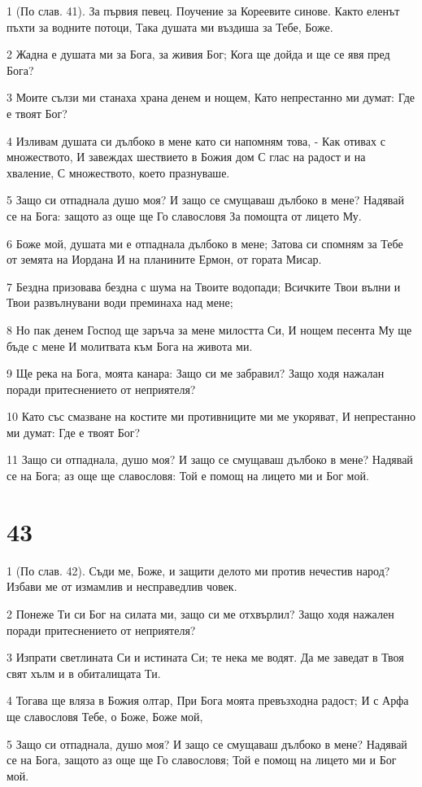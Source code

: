 \par 1 (По слав. 41). За първия певец. Поучение за Кореевите синове. Както еленът пъхти за водните потоци, Така душата ми въздиша за Тебе, Боже.
\par 2 Жадна е душата ми за Бога, за живия Бог; Кога ще дойда и ще се явя пред Бога?
\par 3 Моите сълзи ми станаха храна денем и нощем, Като непрестанно ми думат: Где е твоят Бог?
\par 4 Изливам душата си дълбоко в мене като си напомням това, - Как отивах с множеството, И завеждах шествието в Божия дом С глас на радост и на хваление, С множеството, което празнуваше.
\par 5 Защо си отпаднала душо моя? И защо се смущаваш дълбоко в мене? Надявай се на Бога: защото аз още ще Го славословя За помощта от лицето Му.
\par 6 Боже мой, душата ми е отпаднала дълбоко в мене; Затова си спомням за Тебе от земята на Иордана И на планините Ермон, от гората Мисар.
\par 7 Бездна призовава бездна с шума на Твоите водопади; Всичките Твои вълни и Твои развълнувани води преминаха над мене;
\par 8 Но пак денем Господ ще заръча за мене милостта Си, И нощем песента Му ще бъде с мене И молитвата към Бога на живота ми.
\par 9 Ще река на Бога, моята канара: Защо си ме забравил? Защо ходя нажалан поради притеснението от неприятеля?
\par 10 Като със смазване на костите ми противниците ми ме укоряват, И непрестанно ми думат: Где е твоят Бог?
\par 11 Защо си отпаднала, душо моя? И защо се смущаваш дълбоко в мене? Надявай се на Бога; аз още ще славословя: Той е помощ на лицето ми и Бог мой.

\chapter{43}

\par 1 (По слав. 42). Съди ме, Боже, и защити делото ми против нечестив народ? Избави ме от измамлив и несправедлив човек.
\par 2 Понеже Ти си Бог на силата ми, защо си ме отхвърлил? Защо ходя нажален поради притеснението от неприятеля?
\par 3 Изпрати светлината Си и истината Си; те нека ме водят. Да ме заведат в Твоя свят хълм и в обиталищата Ти.
\par 4 Тогава ще вляза в Божия олтар, При Бога моята превъзходна радост; И с Арфа ще славословя Тебе, о Боже, Боже мой,
\par 5 Защо си отпаднала, душо моя? И защо се смущаваш дълбоко в мене? Надявай се на Бога, защото аз още ще Го славословя; Той е помощ на лицето ми и Бог мой.

